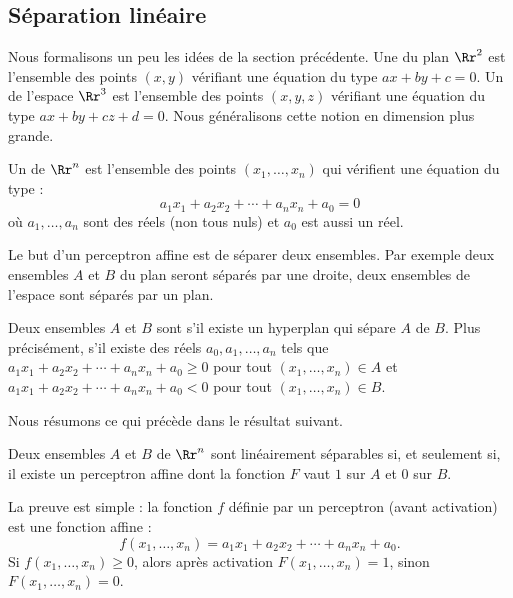 \subsection{Séparation linéaire}

Nous formalisons un peu les idées de la section précédente.
Une   du plan $\Rr^2$ est l'ensemble des points $(x,y)$ vérifiant une équation du type $ax+by+c=0$. Un   de l'espace $\Rr^3$ est l'ensemble des points $(x,y,z)$ vérifiant une équation du type $ax+by+cz+d=0$.  Nous généralisons cette notion en dimension plus grande.
\begin{definition}{}{}
	Un   de $\Rr^n$ est l'ensemble des points $(x_1,\ldots,x_n)$ qui vérifient une équation du type :
	$$a_1 x_1 + a_2 x_2 + \cdots + a_n x_n + a_0=0$$
	où $a_1,\ldots,a_n$ sont des réels (non tous nuls) et $a_0$ est aussi un réel.
\end{definition}


Le but d'un perceptron affine est de séparer deux ensembles. Par exemple deux ensembles $A$ et $B$ du plan seront séparés par une droite, deux ensembles de l'espace sont séparés par un plan.

\begin{definition}{}{}
	Deux ensembles $A$ et $B$ sont   s'il existe un hyperplan qui sépare $A$ de $B$. Plus précisément, s'il existe des réels  $a_0,a_1,\ldots,a_n$ tels que $a_1 x_1 + a_2 x_2 + \cdots + a_n x_n + a_0 \ge 0$ pour tout $(x_1,\ldots,x_n) \in A$ et $a_1 x_1 + a_2 x_2 + \cdots + a_n x_n + a_0 < 0$ pour tout $(x_1,\ldots,x_n) \in B$.
\end{definition}


Nous résumons ce qui précède dans le résultat suivant.
\begin{proposition}{}{}
	Deux ensembles $A$ et $B$ de $\Rr^n$ sont linéairement séparables si, et seulement si, il existe un perceptron affine dont la fonction $F$ vaut $1$ sur $A$ et $0$ sur $B$.
\end{proposition}

La preuve est simple : la fonction $f$ définie par un perceptron (avant activation) est une fonction affine :
$$f(x_1,\ldots,x_n) = a_1 x_1 + a_2 x_2 + \cdots + a_n x_n + a_0.$$
Si $f(x_1,\ldots,x_n) \ge 0$, alors après activation $F(x_1,\ldots,x_n)=1$, sinon $F(x_1,\ldots,x_n)=0$.


